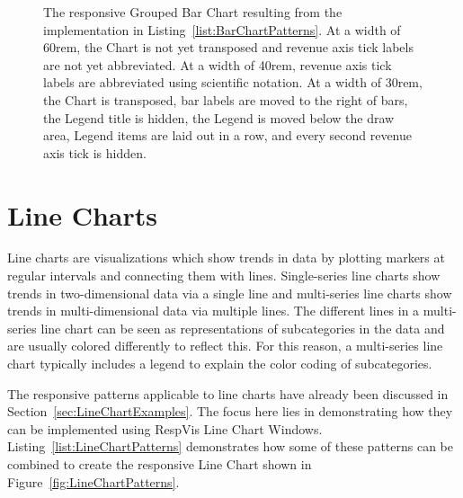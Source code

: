 \begin{figure}[tp]
{  \label{fig:BarChartPatterns30rem}%
}
\caption[Responsive RespVis Grouped Bar Chart]{%
The responsive Grouped Bar Chart resulting from the implementation in
Listing~\ref{list:BarChartPatterns}.
 At a width of 60rem, the Chart is
not yet transposed and revenue axis tick labels are not yet
abbreviated.  At a width of 40rem,
revenue axis tick labels are abbreviated using scientific notation.
 At a width of 30rem, the Chart is
transposed, bar labels are moved to the right of bars, the Legend
title is hidden, the Legend is moved below the draw area, Legend items
are laid out in a row, and every second revenue axis tick is hidden.
}
\label{fig:BarChartPatterns}
\end{figure}









\section{Line Charts}
\label{sec:LineChartsUsage}

Line charts are visualizations which show trends in data by plotting
markers at regular intervals and connecting them with lines.
Single-series line charts show trends in two-dimensional data via a
single line and multi-series line charts show trends in
multi-dimensional data via multiple lines. The different lines in a
multi-series line chart can be seen as representations of
subcategories in the data and are usually colored differently to
reflect this. For this reason, a multi-series line chart typically
includes a legend to explain the color coding of subcategories.


The responsive patterns applicable to line charts have already been
discussed in Section~\ref{sec:LineChartExamples}. The focus here lies
in demonstrating how they can be implemented using RespVis Line Chart
Windows. Listing~\ref{list:LineChartPatterns} demonstrates how some of
these patterns can be combined to create the responsive Line Chart
shown in Figure~\ref{fig:LineChartPatterns}.


